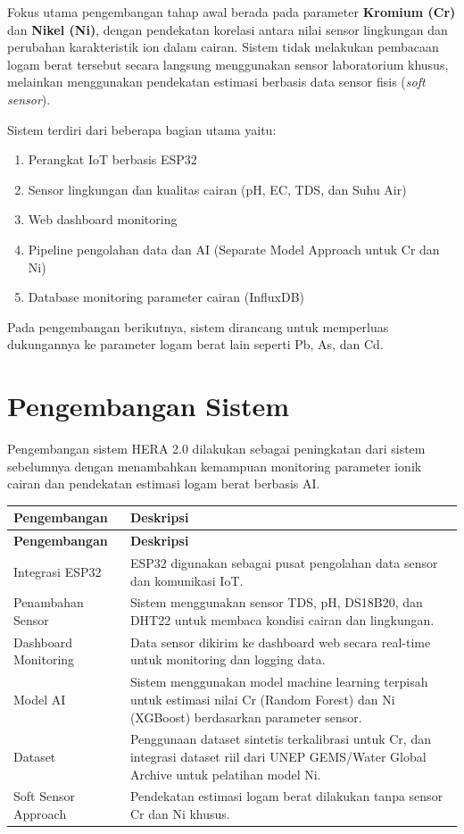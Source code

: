 \documentclass[12pt,a4paper]{article}
\begin{document}
Fokus utama pengembangan tahap awal berada pada parameter \textbf{Kromium (Cr)} dan \textbf{Nikel (Ni)}, dengan pendekatan korelasi antara nilai sensor lingkungan dan perubahan karakteristik ion dalam cairan. Sistem tidak melakukan pembacaan logam berat tersebut secara langsung menggunakan sensor laboratorium khusus, melainkan menggunakan pendekatan estimasi berbasis data sensor fisis (\textit{soft sensor}).

Sistem terdiri dari beberapa bagian utama yaitu:

\begin{enumerate}
    \item Perangkat IoT berbasis ESP32
    \item Sensor lingkungan dan kualitas cairan (pH, EC, TDS, dan Suhu Air)
    \item Web dashboard monitoring
    \item Pipeline pengolahan data dan AI (Separate Model Approach untuk Cr dan Ni)
    \item Database monitoring parameter cairan (InfluxDB)
\end{enumerate}

Pada pengembangan berikutnya, sistem dirancang untuk memperluas dukungannya ke parameter logam berat lain seperti Pb, As, dan Cd.


\section{Pengembangan Sistem}

Pengembangan sistem HERA 2.0 dilakukan sebagai peningkatan dari sistem sebelumnya dengan menambahkan kemampuan monitoring parameter ionik cairan dan pendekatan estimasi logam berat berbasis AI.

\begin{longtable}{|p{4cm}|p{9cm}|}
\hline
\textbf{Pengembangan} & \textbf{Deskripsi} \\
\hline
\endfirsthead
\hline
\textbf{Pengembangan} & \textbf{Deskripsi} \\
\hline
\endhead
Integrasi ESP32 & ESP32 digunakan sebagai pusat pengolahan data sensor dan komunikasi IoT. \\
\hline
Penambahan Sensor & Sistem menggunakan sensor TDS, pH, DS18B20, dan DHT22 untuk membaca kondisi cairan dan lingkungan. \\
\hline
Dashboard Monitoring & Data sensor dikirim ke dashboard web secara real-time untuk monitoring dan logging data. \\
\hline
Model AI & Sistem menggunakan model machine learning terpisah untuk estimasi nilai Cr (Random Forest) dan Ni (XGBoost) berdasarkan parameter sensor. \\
\hline
Dataset & Penggunaan dataset sintetis terkalibrasi untuk Cr, dan integrasi dataset riil dari UNEP GEMS/Water Global Archive untuk pelatihan model Ni. \\
\hline
Soft Sensor Approach & Pendekatan estimasi logam berat dilakukan tanpa sensor Cr dan Ni khusus. \\
\hline
\end{longtable}
\end{document}
